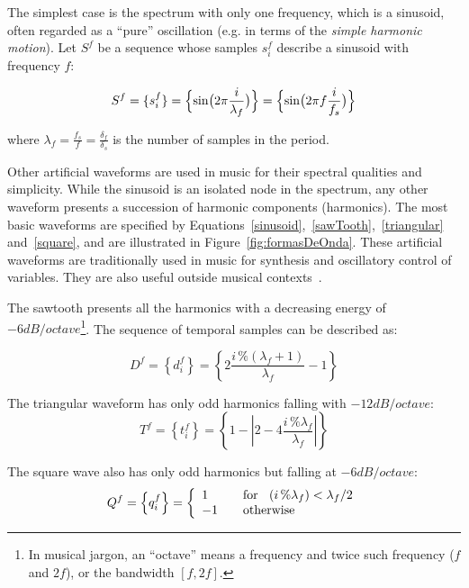 The simplest case is the spectrum with only one frequency, which is a sinusoid, often regarded as a ``pure'' oscillation (e.g. in terms of the \emph{simple harmonic motion}).
Let $S^f$ be a sequence whose samples $s_i^f$ describe a sinusoid with frequency $f$:

\begin{equation}\label{sinusoid}
     S^f=\{ s^f_i \}=\Bigl\{ \sin\bigl(2\pi \frac{i}{\lambda_f} \bigr)  \Bigr\} = \Bigl\{ \sin\bigl(2\pi f \frac{i}{f_s}\bigr)  \Bigr\} 
\end{equation}

\noindent where $\lambda_f=\frac{f_s}{f}=\frac{\delta_f}{\delta_s}$ is the number of samples in the period.

Other artificial waveforms are used in music for their spectral qualities and simplicity.
While the sinusoid is an isolated node in the spectrum, any other waveform presents a succession of harmonic components (harmonics).
The most basic waveforms are specified by Equations~\ref{sinusoid},~\ref{sawTooth},~\ref{triangular} and~\ref{square}, and are illustrated in Figure~\ref{fig:formasDeOnda}.
These artificial waveforms are traditionally used in music for synthesis and oscillatory control of variables. They are also useful outside musical contexts~\cite{Openheim}.

The sawtooth presents all the harmonics with a decreasing energy of $-6dB/octave$\footnote{In 
musical jargon, an ``octave'' means a frequency and twice such frequency ($f$ and $2f$), or the bandwidth $[f,2f]$.}.
The sequence of temporal samples can be described as:

\begin{equation}\label{sawTooth}
	D^f=\left\{ d^f_i \right\}=\left\{ 2\frac{i\,\%(\lambda_f+1)}{\lambda_f} -1 \right\}
\end{equation}

The triangular waveform has only odd harmonics falling with $-12dB/octave$:
\begin{equation}\label{triangular}
     T^f=\left\{ t^f_i \right\}=\left\{1- \left| 2 - 4\frac{i\,\%\lambda_f}{\lambda_f} \right| \right\}
\end{equation}

The square wave also has only odd harmonics but falling at $-6dB/octave$:
\begin{equation}\label{square}
     Q^f=\left\{ q^f_i \right\}= \left\{
         \begin{array}{l l}
              1 & \quad \text{for } \; \; (i\,\%\lambda_f)   <  \lambda_f /2  \\
              -1 & \quad \text{otherwise}\\
         \end{array} \right.
\end{equation}

